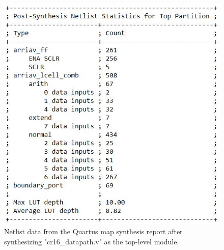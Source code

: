 \documentclass[conference]{IEEEtran}
\begin{document}
\begin{figure}[h]
    \centering
    \includegraphics[scale=0.5]{lab_2_figures/analysis_and_synthesis_netlist.JPG}
    \caption{Netlist data from the Quartus map synthesis report after synthesizing "cr16\_datapath.v" as the top-level module.}
    \label{fig:datapath_analysis_netlist}
\end{figure}
\end{document}
